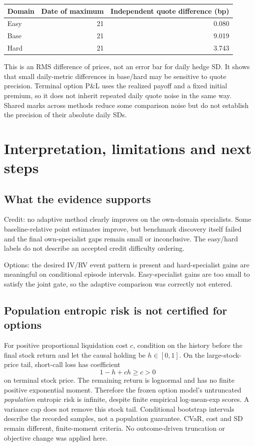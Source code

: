 \documentclass[11pt,a4paper]{article}
\begin{document}
\begin{small}
\begin{tabular}{lrr}
\toprule
Domain & Date of maximum & Independent quote difference (bp) \\
\midrule
Easy & 21 & 0.080 \\
Base & 21 & 9.019 \\
Hard & 21 & 3.743 \\
\bottomrule
\end{tabular}
\end{small}\par\medskip
This is an RMS difference of prices, not an error bar for daily hedge SD. It shows that small daily-metric differences in base/hard may be sensitive to quote precision. Terminal option P\&L uses the realized payoff and a fixed initial premium, so it does not inherit repeated daily quote noise in the same way. Shared marks across methods reduce some comparison noise but do not establish the precision of their absolute daily SDs.
\clearpage
\section{Interpretation, limitations and next steps}
\label{sec:limitations}
\subsection*{What the evidence supports}
Credit: no adaptive method clearly improves on the own-domain specialists. Some baseline-relative point estimates improve, but benchmark discovery itself failed and the final own-specialist gaps remain small or inconclusive. The easy/hard labels do not describe an accepted credit difficulty ordering.

Options: the desired IV/RV event pattern is present and hard-specialist gains are meaningful on conditional episode intervals. Easy-specialist gains are too small to satisfy the joint gate, so the adaptive comparison was correctly not entered.

\subsection*{Population entropic risk is not certified for options}
For positive proportional liquidation cost \(c\), condition on the history before the final stock return and let the causal holding be \(h\in[0,1]\). On the large-stock-price tail, short-call loss has coefficient
\[
 1-h+ch\geq c>0
\]
on terminal stock price. The remaining return is lognormal and has no finite positive exponential moment. Therefore the frozen option model's untruncated \emph{population} entropic risk is infinite, despite finite empirical log-mean-exp scores. A variance cap does not remove this stock tail. Conditional bootstrap intervals describe the recorded samples, not a population guarantee. CVaR, cost and SD remain different, finite-moment criteria. No outcome-driven truncation or objective change was applied here.
\end{document}
